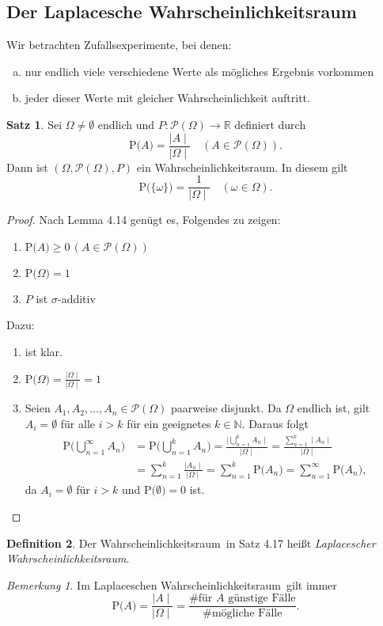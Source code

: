 \documentclass[a4paper,12pt,fleqn]{scrartcl}
\newcommand{\N}{\mathbb{N}}
\newcommand{\R}{\mathbb{R}}
\newcommand{\m}[1]{\mathcal{ #1 }}
\newcommand{\p}[1]{\text{P(} #1 \text{)}}
\newcommand{\ZE}{Zufallsexperiment}
\newcommand{\WR}{Wahrscheinlichkeitsraum}
\theoremstyle{definition}
\newtheorem{definition}{Definition}[section]
\newtheorem{satz}[definition]{Satz}
\theoremstyle{plain}
\theoremstyle{remark}
\newtheorem*{bemerkung}{Bemerkung}
\begin{document}
\subsection{Der Laplacesche \WR}
Wir betrachten \ZE e, bei denen:
\begin{enumerate}[a)]
\item nur endlich viele verschiedene Werte als mögliches Ergebnis vorkommen
\item jeder dieser Werte mit gleicher Wahrscheinlichkeit auftritt.
\end{enumerate}
\begin{satz}
Sei $\Omega \neq \emptyset$ endlich und $P: \m{P}(\Omega) \rightarrow \R$ definiert durch
\[\p{A} = \frac{\mid A \mid}{\mid \Omega \mid} \quad (A \in \m{P}(\Omega)).\]
Dann ist $(\Omega, \m{P}(\Omega), P)$ ein \WR. In diesem gilt
\[\p{\{\omega\}} = \frac{1}{\mid \Omega \mid} \quad (\omega \in \Omega).\]
\end{satz}
\begin{proof}
Nach Lemma 4.14 genügt es, Folgendes zu zeigen:
\begin{enumerate}[(1)]
\item $\p{A} \geq 0 \, (A \in \m{P}(\Omega))$
\item $\p{\Omega} = 1$
\item $P$ ist $\sigma$-additiv
\end{enumerate}
Dazu:
\begin{enumerate}[(1)]
\item ist klar.
\item $\p{\Omega} = \frac{\mid \Omega \mid}{\mid \Omega \mid} = 1$
\item Seien $A_1, A_2, \ldots, A_n \in \m{P}(\Omega)$ paarweise disjunkt. Da $\Omega$ endlich ist, gilt $A_i = \emptyset$ für alle $i > k$ für ein geeignetes $k \in \N$. Daraus folgt
\begin{align*}
\p{\bigcup_{n=1}^\infty A_n} &= \p{\bigcup_{n=1}^k A_n} = \frac{\mid \bigcup_{n=1}^k A_n \mid}{\mid \Omega \mid} = \frac{\sum_{n=1}^k \mid A_n \mid}{\mid \Omega \mid} \\
&= \sum_{n=1}^k \frac{\mid A_n \mid}{\mid \Omega \mid} = \sum_{n=1}^k \p{A_n} = \sum_{n=1}^\infty \p{A_n},
\end{align*}
da $A_i = \emptyset$ für $i > k$ und $\p{\emptyset} = 0$ ist.
\end{enumerate}
\end{proof}
\begin{definition}
Der \WR \, in Satz 4.17 heißt \emph{Laplacescher \WR}.
\end{definition}
\begin{bemerkung}
Im Laplaceschen \WR \, gilt immer
\[\p{A} = \frac{\mid A \mid}{\mid \Omega \mid} = \frac{\text{\# für } A \text{ günstige Fälle}}{\text{\# mögliche Fälle}}.\]
\end{bemerkung}
\end{document}
